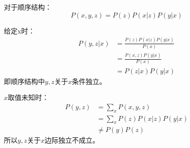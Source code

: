 \documentclass{ctexart}
\begin{document}
对于顺序结构：
$$
    P(x, y, z) = P(z) P(x|z) P(y|x)
$$

给定x时：
$$
\begin{aligned}
    P(y, z|x) &= \frac{P(z)P(x|z)P(y|x)}{P(x)} \\
              &= \frac{P(x, z)P(y|x)}{P(x)}\\
              &= {P(z|x)P(y|x)}
\end{aligned}
$$
即顺序结构中$y,z$关于$x$条件独立。

$x$取值未知时：
$$
\begin{aligned}
    P(y,z) &= \sum_x P(x,y,z)\\
    &= \sum_x P(z)P(x|z)P(y|x)\\
    & \neq P(y)P(z)
\end{aligned}
$$
所以$y,z$关于$x$边际独立不成立。  
\end{document}
